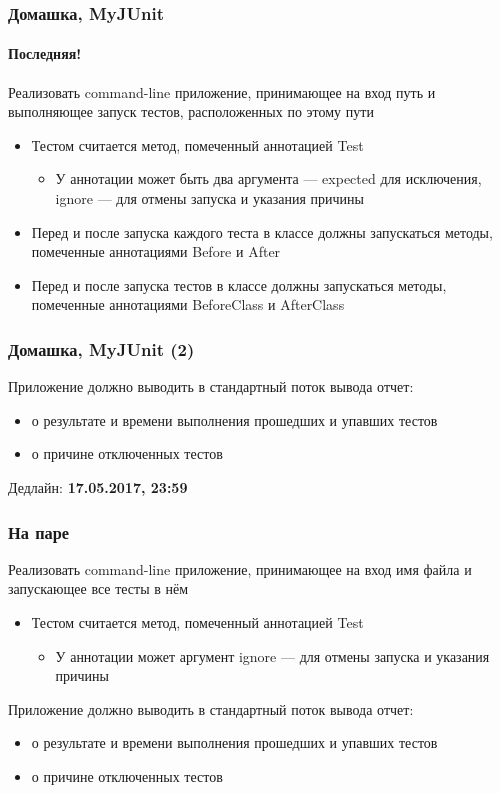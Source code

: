 \documentclass[xetex,mathserif,serif]{beamer}
\begin{document}
	\begin{frame}
		\frametitle{Домашка, MyJUnit}
		\framesubtitle{Последняя!}
		Реализовать command-line приложение, принимающее на вход путь и выполняющее запуск тестов, расположенных по этому пути
		\begin{itemize}
			\item Тестом считается метод, помеченный аннотацией Test
			\begin{itemize}
				\item У аннотации может быть два аргумента --- expected для исключения, ignore --- для отмены запуска и указания причины
			\end{itemize}
			\item Перед и после запуска каждого теста в классе должны запускаться методы, помеченные аннотациями Before и After
			\item Перед и после запуска тестов в классе должны запускаться методы, помеченные аннотациями BeforeClass и AfterClass
		\end{itemize}
	\end{frame}

	\begin{frame}
		\frametitle{Домашка, MyJUnit (2)}
		Приложение должно выводить в стандартный поток вывода отчет:
		\begin{itemize}
			\item о результате и времени выполнения прошедших и упавших тестов
			\item о причине отключенных тестов
		\end{itemize}
		Дедлайн: \textbf{17.05.2017, 23:59}
	\end{frame}


	\begin{frame}
		\frametitle{На паре}
		Реализовать command-line приложение, принимающее на вход имя файла и запускающее все тесты в нём
		\begin{itemize}
			\item Тестом считается метод, помеченный аннотацией Test
			\begin{itemize}
				\item У аннотации может аргумент ignore --- для отмены запуска и указания причины
			\end{itemize}
		\end{itemize}
		Приложение должно выводить в стандартный поток вывода отчет:
		\begin{itemize}
			\item о результате и времени выполнения прошедших и упавших тестов
			\item о причине отключенных тестов
		\end{itemize}
	\end{frame}
\end{document}
